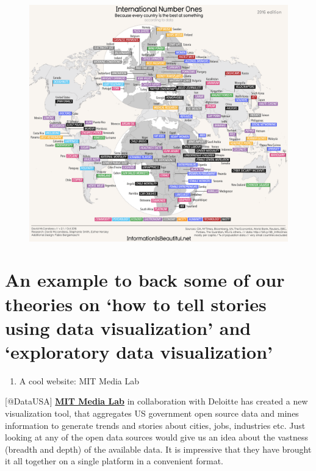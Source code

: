 \documentclass[]{book}
\providecommand{\tightlist}{%
  \setlength{\itemsep}{0pt}\setlength{\parskip}{0pt}}
\theoremstyle{definition}
\theoremstyle{definition}
\theoremstyle{definition}
\theoremstyle{remark}
\begin{document}
\begin{figure}
\centering
\includegraphics{images/Number_ones.png}
\caption{}
\end{figure}

\section{\texorpdfstring{An example to back some of our theories on `how
to tell stories using data visualization' and `exploratory data
visualization'}{An example to back some of our theories on how to tell stories using data visualization and exploratory data visualization}}\label{an-example-to-back-some-of-our-theories-on-how-to-tell-stories-using-data-visualization-and-exploratory-data-visualization}

\begin{enumerate}
\def\labelenumi{\arabic{enumi}.}
\tightlist
\item
  A cool website: MIT Media Lab
\end{enumerate}

{[}@DataUSA{]} \href{https://www.media.mit.edu}{\textbf{MIT Media Lab}}
in collaboration with Deloitte has created a new visualization tool,
that aggregates US government open source data and mines information to
generate trends and stories about cities, jobs, industries etc. Just
looking at any of the open data sources would give us an idea about the
vastness (breadth and depth) of the available data. It is impressive
that they have brought it all together on a single platform in a
convenient format.
\end{document}
